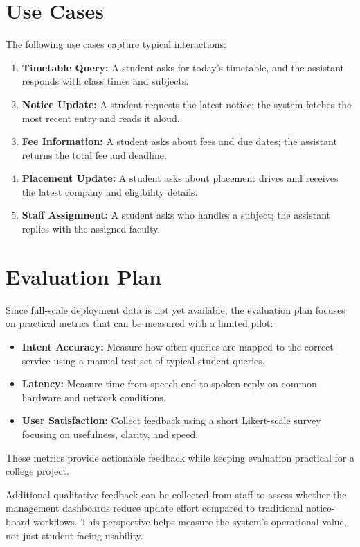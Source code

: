 ﻿\documentclass[conference]{IEEEtran}
\begin{document}
\section{Use Cases}
The following use cases capture typical interactions:
\begin{enumerate}[leftmargin=*]
\item \textbf{Timetable Query:} A student asks for today’s timetable, and the assistant responds with class times and subjects.
\item \textbf{Notice Update:} A student requests the latest notice; the system fetches the most recent entry and reads it aloud.
\item \textbf{Fee Information:} A student asks about fees and due dates; the assistant returns the total fee and deadline.
\item \textbf{Placement Update:} A student asks about placement drives and receives the latest company and eligibility details.
\item \textbf{Staff Assignment:} A student asks who handles a subject; the assistant replies with the assigned faculty.
\end{enumerate}

\section{Evaluation Plan}
Since full-scale deployment data is not yet available, the evaluation plan focuses on practical metrics that can be measured with a limited pilot:
\begin{itemize}[leftmargin=*]
\item \textbf{Intent Accuracy:} Measure how often queries are mapped to the correct service using a manual test set of typical student queries.
\item \textbf{Latency:} Measure time from speech end to spoken reply on common hardware and network conditions.
\item \textbf{User Satisfaction:} Collect feedback using a short Likert-scale survey focusing on usefulness, clarity, and speed.
\end{itemize}

These metrics provide actionable feedback while keeping evaluation practical for a college project.

Additional qualitative feedback can be collected from staff to assess whether the management dashboards reduce update effort compared to traditional notice-board workflows. This perspective helps measure the system's operational value, not just student-facing usability.
\end{document}
